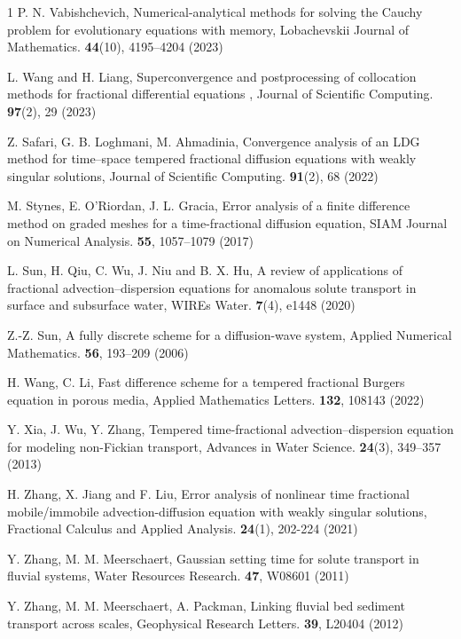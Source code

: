 \documentclass[10pt, reqno]{amsart}
\theoremstyle{remark}
\theoremstyle{definition}
\numberwithin{table}{section}
\begin{document}
\begin{thebibliography}{1}
P. N. Vabishchevich, Numerical-analytical methods for solving the Cauchy problem for evolutionary equations with memory, Lobachevskii Journal of Mathematics. \textbf{44}(10), 4195--4204 (2023)

L. Wang and H. Liang, Superconvergence and postprocessing of collocation methods for fractional differential equations
, Journal of Scientific Computing.  \textbf{97}(2), 29 (2023)

Z. Safari, G. B. Loghmani, M. Ahmadinia, Convergence analysis of an LDG method for time–space tempered fractional diffusion equations with weakly singular solutions, Journal of Scientific Computing. \textbf{91}(2), 68 (2022)

M. Stynes, E. O’Riordan, J. L. Gracia, Error analysis of a finite difference method on graded meshes for a time-fractional diffusion equation, SIAM Journal on Numerical Analysis. \textbf{55}, 1057--1079 (2017)

L. Sun, H. Qiu, C. Wu, J. Niu and B. X. Hu, A review of applications of fractional advection–dispersion equations for anomalous solute transport in surface and subsurface water, WIREs Water. \textbf{7}(4), e1448 (2020)

Z.-Z. Sun, A fully discrete scheme for a diffusion-wave system, Applied Numerical Mathematics. \textbf{56}, 193--209 (2006)

H. Wang, C. Li, Fast difference scheme for a tempered fractional Burgers equation in porous media, Applied Mathematics Letters. \textbf{132}, 108143 (2022)

Y. Xia, J. Wu, Y. Zhang, Tempered time-fractional advection–dispersion equation for modeling non-Fickian transport, Advances in Water Science. \textbf{24}(3), 349--357 (2013)

H. Zhang, X. Jiang and F. Liu, Error analysis of nonlinear time fractional mobile/immobile advection-diffusion equation with weakly singular solutions, Fractional Calculus and Applied Analysis. \textbf{24}(1), 202-224 (2021)


Y. Zhang, M. M. Meerschaert, Gaussian setting time for solute transport in fluvial systems, Water Resources Research. \textbf{47}, W08601 (2011)

Y. Zhang, M. M. Meerschaert, A. Packman, Linking fluvial bed sediment transport across scales, Geophysical Research Letters. \textbf{39}, L20404 (2012)


\end{thebibliography}
\end{document}
